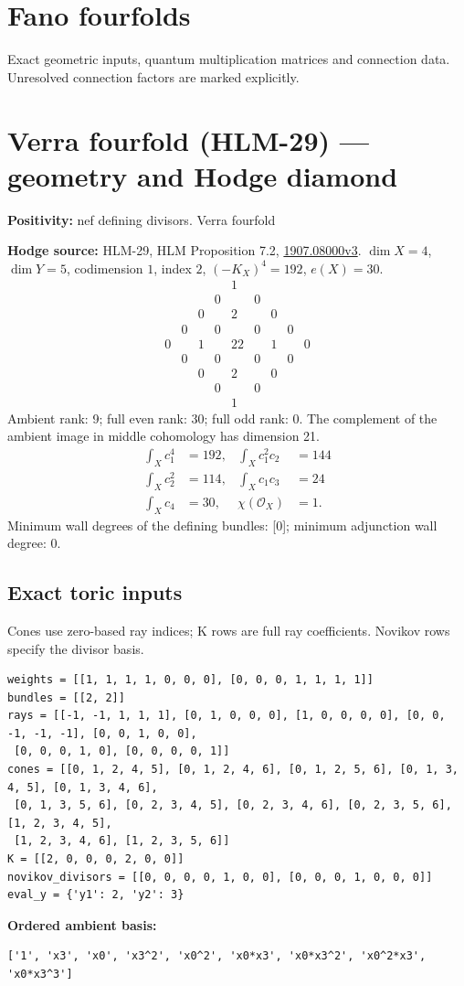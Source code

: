 \documentclass[10pt,a4paper]{article}
\newcommand{\hodge}[4]{\begin{array}{ccccccccc}
&&&&1&&&&\\&&&0&&0&&&\\&&0&&#1&&0&&\\&0&&#2&&#2&&0&\\
0&&#3&&#4&&#3&&0\\&0&&#2&&#2&&0&\\&&0&&#1&&0&&\\&&&0&&0&&&\\&&&&1&&&&\end{array}}
\begin{document}
\section*{Fano fourfolds}
Exact geometric inputs, quantum multiplication matrices and connection data. Unresolved connection factors are marked explicitly.
\clearpage\section*{Verra fourfold (HLM-29) --- geometry and Hodge diamond}\label{entry:HLM-29}
\textbf{Positivity:} nef defining divisors.
{\large\color{accent}Verra fourfold}\par
\textbf{Hodge source:} HLM-29, HLM Proposition 7.2, \href{https://arxiv.org/abs/1907.08000v3}{1907.08000v3}.
$\dim X=4$, $\dim Y=5$, codimension $1$, index $2$, $(-K_X)^4=192$, $e(X)=30$.
\[\hodge{2}{0}{1}{22}\]
Ambient rank: 9; full even rank: 30; full odd rank: 0. The complement of the ambient image in middle cohomology has dimension 21.
\[\begin{aligned}\int_Xc_1^4&=192,&\int_Xc_1^2c_2&=144\\\int_Xc_2^2&=114,&\int_Xc_1c_3&=24\\\int_Xc_4&=30,&\chi(\mathcal O_X)&=1.\end{aligned}\]
Minimum wall degrees of the defining bundles: [0]; minimum adjunction wall degree: 0.
\subsection*{Exact toric inputs}
Cones use zero-based ray indices; K rows are full ray coefficients. Novikov rows specify the divisor basis.

\begin{lstlisting}
weights = [[1, 1, 1, 1, 0, 0, 0], [0, 0, 0, 1, 1, 1, 1]]
bundles = [[2, 2]]
rays = [[-1, -1, 1, 1, 1], [0, 1, 0, 0, 0], [1, 0, 0, 0, 0], [0, 0, -1, -1, -1], [0, 0, 1, 0, 0],
 [0, 0, 0, 1, 0], [0, 0, 0, 0, 1]]
cones = [[0, 1, 2, 4, 5], [0, 1, 2, 4, 6], [0, 1, 2, 5, 6], [0, 1, 3, 4, 5], [0, 1, 3, 4, 6],
 [0, 1, 3, 5, 6], [0, 2, 3, 4, 5], [0, 2, 3, 4, 6], [0, 2, 3, 5, 6], [1, 2, 3, 4, 5],
 [1, 2, 3, 4, 6], [1, 2, 3, 5, 6]]
K = [[2, 0, 0, 0, 2, 0, 0]]
novikov_divisors = [[0, 0, 0, 0, 1, 0, 0], [0, 0, 0, 1, 0, 0, 0]]
eval_y = {'y1': 2, 'y2': 3}
\end{lstlisting}

\textbf{Ordered ambient basis:}
\begin{lstlisting}
['1', 'x3', 'x0', 'x3^2', 'x0^2', 'x0*x3', 'x0*x3^2', 'x0^2*x3', 'x0*x3^3']
\end{lstlisting}
\end{document}
